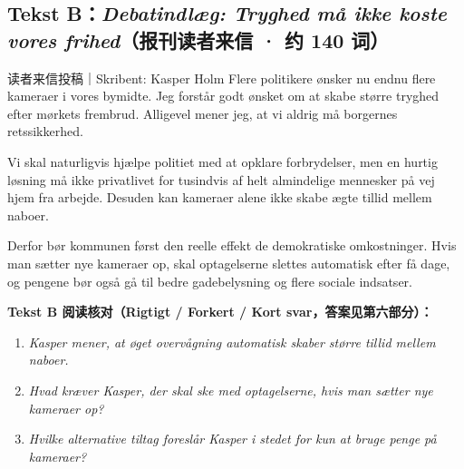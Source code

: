 \subsection*{Tekst B：\textit{Debatindlæg: Tryghed må ikke koste vores frihed}（报刊读者来信 · 约 140 词）}

\begin{emailbox}{读者来信投稿｜Skribent: Kasper Holm}
Flere politikere ønsker nu endnu flere kameraer i vores bymidte. Jeg forstår godt ønsket om at skabe større tryghed efter mørkets frembrud. Alligevel mener jeg, at vi aldrig må  borgernes retssikkerhed.

Vi skal naturligvis hjælpe politiet med at opklare forbrydelser, men en hurtig løsning må ikke  privatlivet for tusindvis af helt almindelige mennesker på vej hjem fra arbejde. Desuden kan kameraer alene ikke skabe ægte tillid mellem naboer.

Derfor bør kommunen først  den reelle effekt  de demokratiske omkostninger. Hvis man sætter nye kameraer op, skal optagelserne slettes automatisk efter få dage, og pengene bør også gå til bedre gadebelysning og flere sociale indsatser.
\end{emailbox}

\textbf{Tekst B 阅读核对（Rigtigt / Forkert / Kort svar，答案见第六部分）：}
\begin{enumerate}
  \item \textit{Kasper mener, at øget overvågning automatisk skaber større tillid mellem naboer.} \underline{\hspace{2.2cm}}
  \item \textit{Hvad kræver Kasper, der skal ske med optagelserne, hvis man sætter nye kameraer op?} \underline{\hspace{2.2cm}}
  \item \textit{Hvilke alternative tiltag foreslår Kasper i stedet for kun at bruge penge på kameraer?} \underline{\hspace{2.2cm}}
\end{enumerate}

